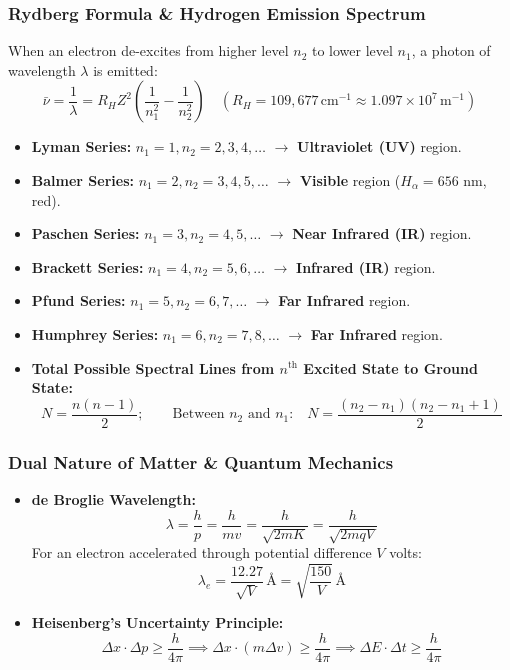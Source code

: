 \documentclass[11pt,a4paper]{article}
\begin{document}
\subsubsection{Rydberg Formula \& Hydrogen Emission Spectrum}
When an electron de-excites from higher level $n_2$ to lower level $n_1$, a photon of wavelength $\lambda$ is emitted:
\[
  \bar{\nu} = \frac{1}{\lambda} = R_H Z^2 \left(\frac{1}{n_1^2} - \frac{1}{n_2^2}\right) \quad (R_H = 109,677 \, \text{cm}^{-1} \approx 1.097 \times 10^7 \, \text{m}^{-1})
\]
\begin{itemize}[leftmargin=1.5em, itemsep=2pt]
  \item \textbf{Lyman Series:} $n_1 = 1, n_2 = 2, 3, 4, \dots$ $\to$ \textbf{Ultraviolet (UV)} region.
  \item \textbf{Balmer Series:} $n_1 = 2, n_2 = 3, 4, 5, \dots$ $\to$ \textbf{Visible} region ($H_\alpha = 656\text{ nm}$, red).
  \item \textbf{Paschen Series:} $n_1 = 3, n_2 = 4, 5, \dots$ $\to$ \textbf{Near Infrared (IR)} region.
  \item \textbf{Brackett Series:} $n_1 = 4, n_2 = 5, 6, \dots$ $\to$ \textbf{Infrared (IR)} region.
  \item \textbf{Pfund Series:} $n_1 = 5, n_2 = 6, 7, \dots$ $\to$ \textbf{Far Infrared} region.
  \item \textbf{Humphrey Series:} $n_1 = 6, n_2 = 7, 8, \dots$ $\to$ \textbf{Far Infrared} region.
  \item \textbf{Total Possible Spectral Lines from $n^{\text{th}}$ Excited State to Ground State:}
  \[
    N = \frac{n(n-1)}{2}; \qquad \text{Between $n_2$ and $n_1$:} \quad N = \frac{(n_2 - n_1)(n_2 - n_1 + 1)}{2}
  \]
\end{itemize}

\subsubsection{Dual Nature of Matter \& Quantum Mechanics}
\begin{itemize}[leftmargin=1.5em, itemsep=2pt]
  \item \textbf{de Broglie Wavelength:}
  \[
    \lambda = \frac{h}{p} = \frac{h}{m v} = \frac{h}{\sqrt{2m K}} = \frac{h}{\sqrt{2mqV}}
  \]
  For an electron accelerated through potential difference $V$ volts:
  \[
    \lambda_e = \frac{12.27}{\sqrt{V}} \, \text{\AA} = \sqrt{\frac{150}{V}} \, \text{\AA}
  \]
  \item \textbf{Heisenberg's Uncertainty Principle:}
  \[
    \Delta x \cdot \Delta p \ge \frac{h}{4\pi} \implies \Delta x \cdot (m \Delta v) \ge \frac{h}{4\pi} \implies \Delta E \cdot \Delta t \ge \frac{h}{4\pi}
  \]
\end{itemize}
\end{document}
